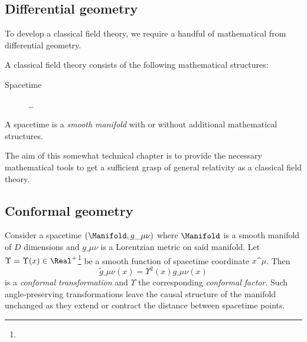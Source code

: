








\begin{draft}{%
    \newcommand*\cfac{\Upsilon}   %
    \section*{Differential geometry}
        To develop a classical field theory, we require a handful of mathematical  from differential geometry.
    
        A classical field theory consists of the following mathematical structures:
        \begin{description}
            \item[Spacetime] \dots
        \end{description}
    
        A spacetime is a \emph{smooth manifold} with or without additional mathematical structures.
    
    
    
        The aim of this somewhat technical chapter is to provide the necessary mathematical tools to get a sufficient grasp of general relativity as a classical field theory.
    
    
    
    
        \subsection*{Conformal geometry}
    
    
    
    
    Consider a spacetime $(\Manifold, g\_{\mu\nu})$ where $\Manifold$ is a smooth manifold of $D$ dimensions and $g\_{\mu\nu}$ is a Lorentzian metric on said manifold. Let $\cfac= \cfac(x)\in \Real^+$\footnote{} be a smooth function of spacetime coordinate $x\^\mu$. Then
    \begin{equation}\label{eq:diffgeo:conformal:conf_trafo}
        \tilde{g}\_{\mu\nu}(x ) = \cfac^2(x) g\_{\mu\nu}(x)
    \end{equation}
    is a \emph{conformal transformation} and $\cfac$ the corresponding \emph{conformal factor}. Such angle-preserving transformations leave the causal structure of the manifold unchanged as they extend or contract the distance between spacetime points. 
    
}
\end{draft}
